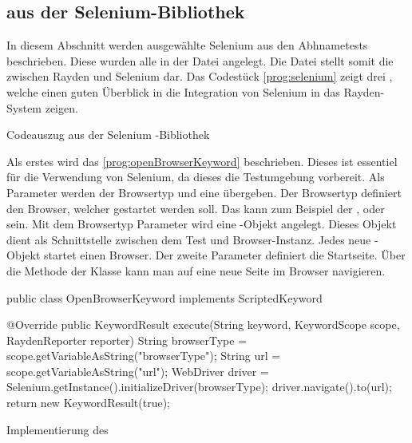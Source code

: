 
\subsection{ aus der Selenium-Bibliothek}
\label{cha:TestenSelenium}

In diesem Abschnitt werden ausgewählte Selenium  aus den Abhnametests beschrieben. Diese  wurden alle in der Datei  angelegt. Die Datei  stellt somit die  zwischen Rayden und Selenium dar. Das Codestück \ref{prog:selenium} zeigt drei , welche einen guten Überblick in die Integration von Selenium in das Rayden-System zeigen. 

\begin{program}

\caption{Codeauszug aus der Selenium -Bibliothek}
\label{prog:selenium}
\end{program}

\SuperPar
Als erstes wird das  \ref{prog:openBrowserKeyword} beschrieben. Dieses  ist essentiel für die Verwendung von Selenium, da dieses  die Testumgebung vorbereit. Als Parameter werden der Browsertyp und eine  übergeben. Der Browsertyp definiert den Browser, welcher gestartet werden soll. Das kann zum Beispiel der ,  oder  sein. Mit dem Browsertyp Parameter wird eine -Objekt angelegt. Dieses Objekt dient als Schnittstelle zwischen dem Test und Browser-Instanz. Jedes neue -Objekt startet einen Browser. Der zweite Parameter  definiert die Startseite. Über die Methode  der Klasse  kann man auf eine neue Seite im Browser navigieren. 

\begin{program}
\begin{JavaCode}
public class OpenBrowserKeyword implements ScriptedKeyword {

	@Override
	public KeywordResult execute(String keyword, KeywordScope scope, RaydenReporter reporter) {
		String browserType = scope.getVariableAsString("browserType");
		String url = scope.getVariableAsString("url");
		WebDriver driver = Selenium.getInstance().initializeDriver(browserType);
		driver.navigate().to(url);
		return new KeywordResult(true);
	}
}
\end{JavaCode}
\caption{Implementierung des }
\label{prog:openBrowserKeyword}
\end{program}

